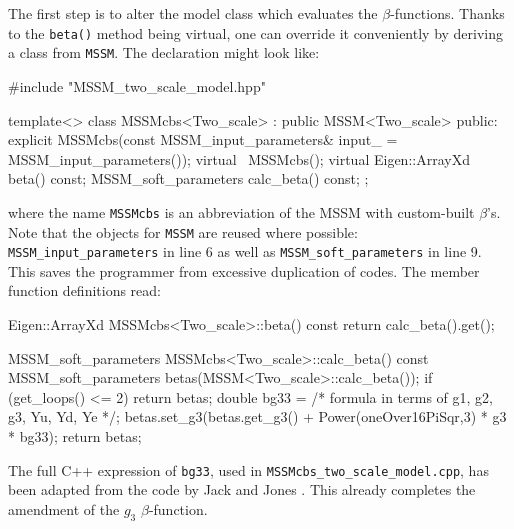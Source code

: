 \documentclass[final,3p,11pt,pdflatex]{elsarticle}
\newcommand{\code}[1]{\lstinline|#1|}  %
\begin{document}
The first step is to alter
the model class which evaluates the $\beta$-functions.
Thanks to the \code{beta()} method being virtual,
one can override it conveniently by deriving a class from \code{MSSM}.
The declaration might look like:
\begin{numlstlisting}
#include "MSSM_two_scale_model.hpp"

template<>
class MSSMcbs<Two_scale> : public MSSM<Two_scale> {
public:
  explicit MSSMcbs(const MSSM_input_parameters& input_ = MSSM_input_parameters());
  virtual ~MSSMcbs();
  virtual Eigen::ArrayXd beta() const;
  MSSM_soft_parameters calc_beta() const;
};
\end{numlstlisting}
where the name \code{MSSMcbs} is an abbreviation of
the MSSM with custom-built $\beta$'s.
Note that the objects for \code{MSSM} are reused where possible:
\code{MSSM_input_parameters} in line 6 as well as
\code{MSSM_soft_parameters} in line 9.
This saves the programmer from excessive duplication of codes.
The member function definitions read:
\begin{numlstlisting}
Eigen::ArrayXd MSSMcbs<Two_scale>::beta() const
{
  return calc_beta().get();
}

MSSM_soft_parameters MSSMcbs<Two_scale>::calc_beta() const
{
  MSSM_soft_parameters betas(MSSM<Two_scale>::calc_beta());
  if (get_loops() <= 2) return betas;
  double bg33 = /* formula in terms of g1, g2, g3, Yu, Yd, Ye */;
  betas.set_g3(betas.get_g3() + Power(oneOver16PiSqr,3) * g3 * bg33);
  return betas;
}
\end{numlstlisting}
The full C++ expression of \code{bg33},
used in \code{MSSMcbs_two_scale_model.cpp},
has been adapted from the code by Jack and Jones \cite{3-loop MSSM betas}.
This already completes the amendment of the $g_3$ $\beta$-function.
\end{document}

